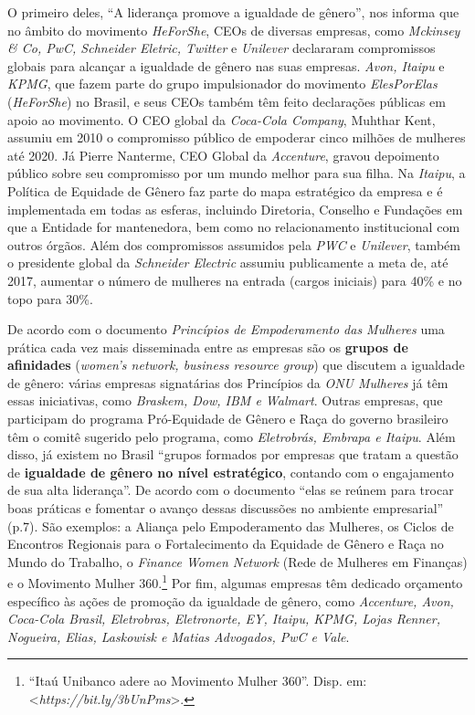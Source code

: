 O primeiro deles, ``A liderança promove a igualdade de gênero'', nos
informa que no âmbito do movimento \emph{HeForShe}, CEOs de diversas
empresas, como \emph{Mckinsey \& Co, PwC, Schneider Eletric, Twitter} e
\emph{Unilever} declararam compromissos globais para alcançar a
igualdade de gênero nas suas empresas. \emph{Avon, Itaipu} e
\emph{KPMG}, que fazem parte do grupo impulsionador do movimento
\emph{ElesPorElas} (\emph{HeForShe}) no Brasil, e seus CEOs também têm
feito declarações públicas em apoio ao movimento. O CEO global da
\emph{Coca-Cola Company}, Muhthar Kent, assumiu em 2010 o compromisso
público de empoderar cinco milhões de mulheres até 2020. Já Pierre
Nanterme, CEO Global da \emph{Accenture}, gravou depoimento público
sobre seu compromisso por um mundo melhor para sua filha. Na
\emph{Itaipu}, a Política de Equidade de Gênero faz parte do mapa
estratégico da empresa e é implementada em todas as esferas, incluindo
Diretoria, Conselho e Fundações em que a Entidade for mantenedora, bem
como no relacionamento institucional com outros órgãos. Além dos
compromissos assumidos pela \emph{PWC} e \emph{Unilever}, também o
presidente global da \emph{Schneider Electric} assumiu publicamente a
meta de, até 2017, aumentar o número de mulheres na entrada (cargos
iniciais) para 40\% e no topo para 30\%.

De acordo com o documento \emph{Princípios de Empoderamento das
Mulheres} uma prática cada vez mais disseminada entre as empresas são os
\textbf{grupos de afinidades} (\emph{women's network, business resource
group}) que discutem a igualdade de gênero: várias empresas signatárias
dos Princípios da \emph{ONU Mulheres} já têm essas iniciativas, como
\emph{Braskem, Dow, IBM e Walmart}. Outras empresas, que participam do
programa Pró-Equidade de Gênero e Raça do governo brasileiro têm o
comitê sugerido pelo programa, como \emph{Eletrobrás, Embrapa e Itaipu}.
Além disso, já existem no Brasil ``grupos formados por empresas que
tratam a questão de \textbf{igualdade de gênero no nível estratégico},
contando com o engajamento de sua alta liderança''. De acordo com o
documento ``elas se reúnem para trocar boas práticas e fomentar o avanço
dessas discussões no ambiente empresarial'' (p.7). São exemplos: a
Aliança pelo Empoderamento das Mulheres, os Ciclos de Encontros
Regionais para o Fortalecimento da Equidade de Gênero e Raça no Mundo do
Trabalho, o \emph{Finance Women Network} (Rede de Mulheres em Finanças)
e o Movimento Mulher 360.\footnote{``Itaú Unibanco adere ao Movimento
  Mulher 360''. Disp. em:
  \textless{}\emph{https://bit.ly/3bUnPms}\textgreater{}.}
Por fim, algumas empresas têm dedicado orçamento específico às ações de
promoção da igualdade de gênero, como \emph{Accenture, Avon, Coca-Cola
Brasil, Eletrobras, Eletronorte, EY, Itaipu, KPMG, Lojas Renner,
Nogueira, Elias, Laskowisk e Matias Advogados, PwC e Vale}.

